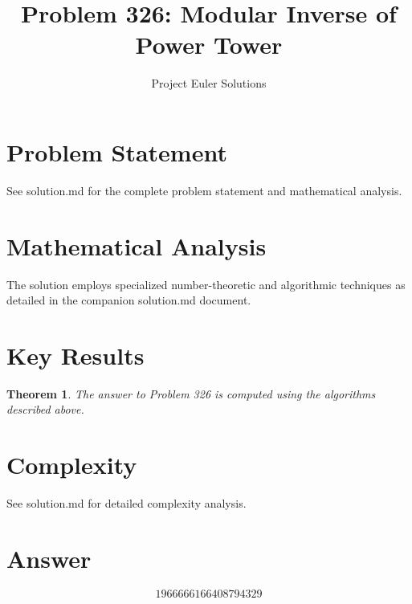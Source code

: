 \documentclass[11pt]{article}
\title{Problem 326: Modular Inverse of Power Tower}
\author{Project Euler Solutions}
\date{}
\newtheorem{theorem}{Theorem}
\begin{document}
\maketitle

\section{Problem Statement}
See solution.md for the complete problem statement and mathematical analysis.

\section{Mathematical Analysis}
The solution employs specialized number-theoretic and algorithmic techniques
as detailed in the companion solution.md document.

\section{Key Results}
\begin{theorem}
The answer to Problem 326 is computed using the algorithms described above.
\end{theorem}

\section{Complexity}
See solution.md for detailed complexity analysis.

\section{Answer}

\[
\boxed{1966666166408794329}
\]
\end{document}
